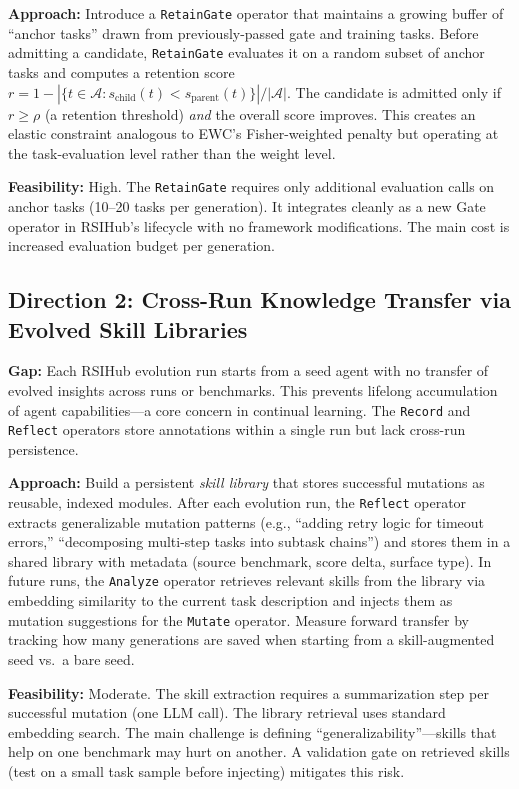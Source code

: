 \documentclass[11pt,a4paper]{article}
\begin{document}
\textbf{Approach:} Introduce a \texttt{RetainGate} operator that maintains a growing buffer of ``anchor tasks'' drawn from previously-passed gate and training tasks. Before admitting a candidate, \texttt{RetainGate} evaluates it on a random subset of anchor tasks and computes a retention score $r = 1 - |\{t \in \mathcal{A} : s_{\text{child}}(t) < s_{\text{parent}}(t)\}| / |\mathcal{A}|$. The candidate is admitted only if $r \geq \rho$ (a retention threshold) \emph{and} the overall score improves. This creates an elastic constraint analogous to EWC's Fisher-weighted penalty but operating at the task-evaluation level rather than the weight level.

\textbf{Feasibility:} High. The \texttt{RetainGate} requires only additional evaluation calls on anchor tasks (10--20 tasks per generation). It integrates cleanly as a new Gate operator in RSIHub's lifecycle with no framework modifications. The main cost is increased evaluation budget per generation.

\subsection{Direction 2: Cross-Run Knowledge Transfer via Evolved Skill Libraries}
\textbf{Gap:} Each RSIHub evolution run starts from a seed agent with no transfer of evolved insights across runs or benchmarks. This prevents lifelong accumulation of agent capabilities---a core concern in continual learning. The \texttt{Record} and \texttt{Reflect} operators store annotations within a single run but lack cross-run persistence.

\textbf{Approach:} Build a persistent \emph{skill library} that stores successful mutations as reusable, indexed modules. After each evolution run, the \texttt{Reflect} operator extracts generalizable mutation patterns (e.g., ``adding retry logic for timeout errors,'' ``decomposing multi-step tasks into subtask chains'') and stores them in a shared library with metadata (source benchmark, score delta, surface type). In future runs, the \texttt{Analyze} operator retrieves relevant skills from the library via embedding similarity to the current task description and injects them as mutation suggestions for the \texttt{Mutate} operator. Measure forward transfer by tracking how many generations are saved when starting from a skill-augmented seed vs.\ a bare seed.

\textbf{Feasibility:} Moderate. The skill extraction requires a summarization step per successful mutation (one LLM call). The library retrieval uses standard embedding search. The main challenge is defining ``generalizability''---skills that help on one benchmark may hurt on another. A validation gate on retrieved skills (test on a small task sample before injecting) mitigates this risk.
\end{document}
